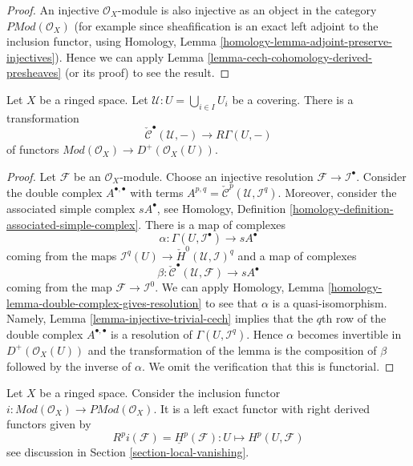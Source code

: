 \begin{proof}
An injective $\mathcal{O}_X$-module is also injective as an object in
the category $\textit{PMod}(\mathcal{O}_X)$ (for example since
sheafification is an exact left adjoint to the inclusion functor,
using Homology, Lemma \ref{homology-lemma-adjoint-preserve-injectives}).
Hence we can apply Lemma \ref{lemma-cech-cohomology-derived-presheaves}
(or its proof) to see the result.
\end{proof}

\begin{lemma}
\label{lemma-cech-cohomology}
Let $X$ be a ringed space.
Let $\mathcal{U} : U = \bigcup_{i \in I} U_i$ be a covering.
There is a transformation
$$
\check{\mathcal{C}}^\bullet(\mathcal{U}, -)
\longrightarrow
R\Gamma(U, -)
$$
of functors
$\textit{Mod}(\mathcal{O}_X) \to D^{+}(\mathcal{O}_X(U))$.
\end{lemma}

\begin{proof}
Let $\mathcal{F}$ be an $\mathcal{O}_X$-module. Choose an injective resolution
$\mathcal{F} \to \mathcal{I}^\bullet$. Consider the double complex
$A^{\bullet, \bullet}$ with terms
$A^{p, q} = \check{\mathcal{C}}^p(\mathcal{U}, \mathcal{I}^q)$.
Moreover, consider the associated simple complex
$sA^\bullet$, see
Homology, Definition \ref{homology-definition-associated-simple-complex}.
There is a map of complexes
$$
\alpha :
\Gamma(U, \mathcal{I}^\bullet)
\longrightarrow
sA^\bullet
$$
coming from the maps
$\mathcal{I}^q(U) \to \check{H}^0(\mathcal{U}, \mathcal{I})^q$
and a map of complexes
$$
\beta :
\check{\mathcal{C}}^\bullet(\mathcal{U}, \mathcal{F})
\longrightarrow
sA^\bullet
$$
coming from the map $\mathcal{F} \to \mathcal{I}^0$.
We can apply
Homology, Lemma \ref{homology-lemma-double-complex-gives-resolution}
to see that $\alpha$ is a quasi-isomorphism.
Namely, Lemma \ref{lemma-injective-trivial-cech} implies that
the $q$th row of the double complex $A^{\bullet, \bullet}$ is a
resolution of $\Gamma(U, \mathcal{I}^q)$.
Hence $\alpha$ becomes invertible in $D^{+}(\mathcal{O}_X(U))$ and
the transformation of the lemma is the composition of $\beta$
followed by the inverse of $\alpha$. We omit the verification
that this is functorial.
\end{proof}

\begin{lemma}
\label{lemma-include}
Let $X$ be a ringed space.
Consider the inclusion functor
$i : \textit{Mod}(\mathcal{O}_X) \to \textit{PMod}(\mathcal{O}_X)$.
It is a left exact functor with right derived functors given by
$$
R^pi(\mathcal{F}) = \underline{H}^p(\mathcal{F}) :
U \longmapsto H^p(U, \mathcal{F})
$$
see discussion in Section \ref{section-local-vanishing}.
\end{lemma}

